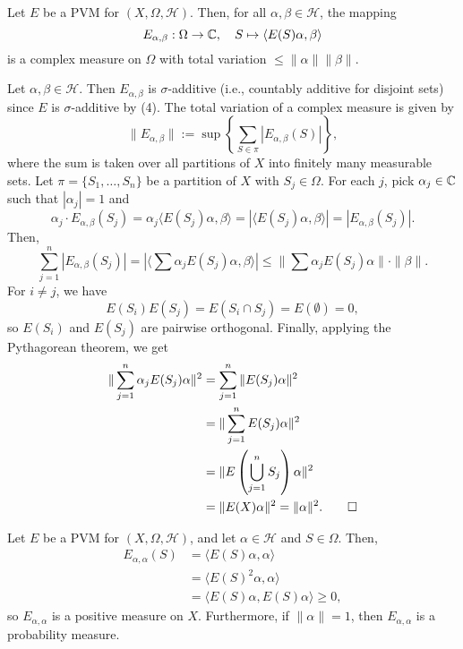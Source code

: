 \begin{lemma}  
  Let $E$ be a PVM for $(X, \Omega, \mathcal{H})$. Then, for all $\alpha, \beta \in \mathcal{H}$, the mapping  
  $$  E_{\alpha, \beta} : \Omega \to \mathbb {C}, \quad S \mapsto \langle E(S) \alpha, \beta \rangle$$
  is a complex measure on $\Omega$ with total variation $\leq \|\alpha\| \|\beta\|$.  
\end{lemma}  

\begin{myproof}  
  Let $\alpha, \beta \in \mathcal{H}$. Then $E_{\alpha, \beta}$ is $\sigma$-additive  
  (i.e., countably additive for disjoint sets) since $E$ is $\sigma$-additive by (4).  
  The total variation of a complex measure is given by  
  $$ \| E_{\alpha, \beta} \| := \sup \left\{\sum_{S \in \pi} |E_{\alpha, \beta} (S)|\right\},  $$
  where the sum is taken over all partitions of $X$ into finitely many measurable sets.  
  Let $\pi = \{S_1, \dots, S_n\}$ be a partition of $X$ with $S_j \in \Omega$.  
  For each $j$, pick $\alpha_j \in \mathbb {C}$ such that $|\alpha_j| = 1$ and  
  $$\alpha_j \cdot E_{\alpha, \beta} (S_j) = \alpha_j \langle E(S_j)\alpha, \beta\rangle = |\langle E(S_j) \alpha, \beta\rangle| = |E_{\alpha, \beta} (S_j)|.$$
  Then,  
  $$\sum_{j = 1} ^n |E_{\alpha, \beta} (S_j)| = |\langle \sum \alpha_j E(S_j) \alpha, \beta\rangle| \leq \| \sum \alpha_j E(S_j) \alpha\| \cdot \|\beta\|.$$
  For $i \neq j$, we have  
  $$ E(S_i) E(S_j) = E(S_i \cap S_j) = E(\emptyset) = 0, $$
  so $E(S_i)$ and $E(S_j)$ are pairwise orthogonal. Finally, applying the Pythagorean theorem, we get  
  \begin{align*}  
    \| \sum_{j = 1} ^n \alpha_j E(S_j) \alpha\|^2 &= \sum_{j = 1} ^n \| E(S_j) \alpha\|^2\\  
    &= \| \sum_{j = 1} ^n E(S_j) \alpha\|^2\\  
    &= \| E\left(\bigcup_{j = 1} ^n S_j\right) \alpha\|^2\\  
    &= \| E(X) \alpha\|^2 = \|\alpha \|^2. \qedhere  
  \end{align*}  
\end{myproof}  

\begin{remark}  
  Let $E$ be a PVM for $(X, \Omega, \mathcal{H})$, and let $\alpha \in \mathcal{H}$ and $S \in \Omega$.  
  Then,  
  \begin{align*}  
    E_{\alpha, \alpha} (S) &= \langle E(S) \alpha, \alpha\rangle\\  
    &= \langle E(S)^2 \alpha, \alpha\rangle\\  
    &= \langle E(S) \alpha, E(S) \alpha\rangle \geq 0,  
  \end{align*}  
  so $E_{\alpha, \alpha}$ is a positive measure on $X$.  
  Furthermore, if $\|\alpha\| = 1$, then $E_{\alpha, \alpha}$ is a probability measure.  
\end{remark}  

